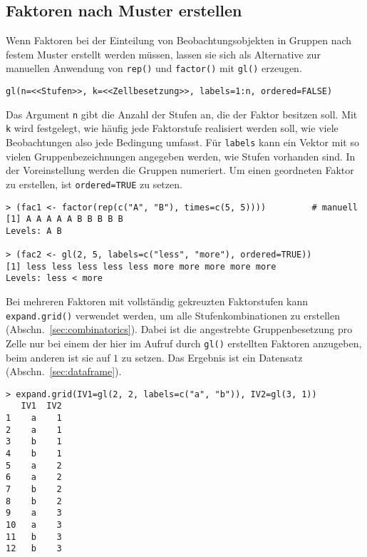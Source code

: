 \subsection{Faktoren nach Muster erstellen}
\label{sec:glExpandGrid}

Wenn Faktoren bei der Einteilung von Beobachtungsobjekten in Gruppen nach festem Muster erstellt werden müssen, lassen sie sich als Alternative zur manuellen Anwendung von \lstinline!rep()! und \lstinline!factor()! mit \lstinline!gl()! erzeugen.
\begin{lstlisting}
gl(n=<<Stufen>>, k=<<Zellbesetzung>>, labels=1:n, ordered=FALSE)
\end{lstlisting}

Das Argument \lstinline!n! gibt die Anzahl der Stufen an, die der Faktor besitzen soll. Mit \lstinline!k! wird festgelegt, wie häufig jede Faktorstufe realisiert werden soll, wie viele Beobachtungen also jede Bedingung umfasst. Für \lstinline!labels! kann ein Vektor mit so vielen Gruppenbezeichnungen angegeben werden, wie Stufen vorhanden sind. In der Voreinstellung werden die Gruppen numeriert. Um einen geordneten Faktor zu erstellen, ist \lstinline!ordered=TRUE! zu setzen.
\begin{lstlisting}
> (fac1 <- factor(rep(c("A", "B"), times=c(5, 5))))         # manuell
[1] A A A A A B B B B B
Levels: A B

> (fac2 <- gl(2, 5, labels=c("less", "more"), ordered=TRUE))
[1] less less less less less more more more more more
Levels: less < more
\end{lstlisting}

Bei mehreren Faktoren mit vollständig gekreuzten Faktorstufen kann \lstinline!expand.grid()! verwendet werden, um alle Stufenkombinationen zu erstellen (Abschn.\ \ref{sec:combinatorics}). Dabei ist die angestrebte Gruppenbesetzung pro Zelle nur bei einem der hier im Aufruf durch \lstinline!gl()! erstellten Faktoren anzugeben, beim anderen ist sie auf $1$ zu setzen. Das Ergebnis ist ein Datensatz (Abschn.\ \ref{sec:dataframe}).
\begin{lstlisting}
> expand.grid(IV1=gl(2, 2, labels=c("a", "b")), IV2=gl(3, 1))
   IV1  IV2
1    a    1
2    a    1
3    b    1
4    b    1
5    a    2
6    a    2
7    b    2
8    b    2
9    a    3
10   a    3
11   b    3
12   b    3
\end{lstlisting}

